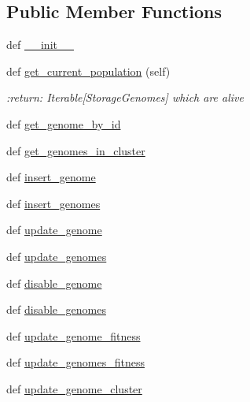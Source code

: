 \subsection*{Public Member Functions}
\begin{DoxyCompactItemize}
\item 
def \hyperlink{classNEAT__PyGenetics_1_1NEAT_1_1Repository_1_1GenomeRepository_1_1GenomeRepository_a2d5029444baeba1137a19954fbdc5192}{\+\_\+\+\_\+init\+\_\+\+\_\+}
\item 
def \hyperlink{classNEAT__PyGenetics_1_1NEAT_1_1Repository_1_1GenomeRepository_1_1GenomeRepository_a02f46e4d4d2d09b0ac2b69174f49e129}{get\+\_\+current\+\_\+population} (self)
\begin{DoxyCompactList}\small\item\em \+:return\+: Iterable\mbox{[}Storage\+Genomes\mbox{]} which are alive \end{DoxyCompactList}\item 
def \hyperlink{classNEAT__PyGenetics_1_1NEAT_1_1Repository_1_1GenomeRepository_1_1GenomeRepository_ac55f0529efead778623d6e3eadafa138}{get\+\_\+genome\+\_\+by\+\_\+id}
\item 
def \hyperlink{classNEAT__PyGenetics_1_1NEAT_1_1Repository_1_1GenomeRepository_1_1GenomeRepository_a307127db97bbcb6ef6bbb2000e64d36c}{get\+\_\+genomes\+\_\+in\+\_\+cluster}
\item 
def \hyperlink{classNEAT__PyGenetics_1_1NEAT_1_1Repository_1_1GenomeRepository_1_1GenomeRepository_ac5457262e579905f051b3a0e4f14cbae}{insert\+\_\+genome}
\item 
def \hyperlink{classNEAT__PyGenetics_1_1NEAT_1_1Repository_1_1GenomeRepository_1_1GenomeRepository_ae5b9ba3a9e6586e42cefdd9daf1379b3}{insert\+\_\+genomes}
\item 
def \hyperlink{classNEAT__PyGenetics_1_1NEAT_1_1Repository_1_1GenomeRepository_1_1GenomeRepository_a62c182ec66b0b0f2e444f6bd62f212a2}{update\+\_\+genome}
\item 
def \hyperlink{classNEAT__PyGenetics_1_1NEAT_1_1Repository_1_1GenomeRepository_1_1GenomeRepository_af596e230a4ae914fda99e8f8dfdab8a3}{update\+\_\+genomes}
\item 
def \hyperlink{classNEAT__PyGenetics_1_1NEAT_1_1Repository_1_1GenomeRepository_1_1GenomeRepository_a9a4f5e6dc63ce8a858a79bdb331cc62c}{disable\+\_\+genome}
\item 
def \hyperlink{classNEAT__PyGenetics_1_1NEAT_1_1Repository_1_1GenomeRepository_1_1GenomeRepository_aad8da608f4c1919e72453f1671761b8e}{disable\+\_\+genomes}
\item 
def \hyperlink{classNEAT__PyGenetics_1_1NEAT_1_1Repository_1_1GenomeRepository_1_1GenomeRepository_a89e1f1e4680f135c1eba0f8d13314896}{update\+\_\+genome\+\_\+fitness}
\item 
def \hyperlink{classNEAT__PyGenetics_1_1NEAT_1_1Repository_1_1GenomeRepository_1_1GenomeRepository_a6e90ef99f78be7ecddc26d8b73416116}{update\+\_\+genomes\+\_\+fitness}
\item 
def \hyperlink{classNEAT__PyGenetics_1_1NEAT_1_1Repository_1_1GenomeRepository_1_1GenomeRepository_a1709665aff216c7567cbc079bc5135c8}{update\+\_\+genome\+\_\+cluster}
\end{DoxyCompactItemize}
